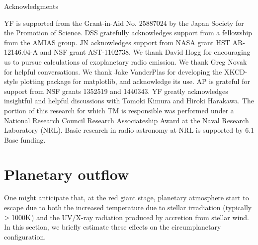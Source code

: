 \documentclass[iop,numberedappendix,apj,twocolappendix,]{emulateapj}
\begin{document}
\acknowledgements

{\sc Acknowledgments}

YF is supported from the Grant-in-Aid No. 25887024 by the Japan Society for the Promotion of Science.
DSS gratefully acknowledges support from a fellowship from the AMIAS group. JN acknowledges support from NASA grant HST AR-12146.04-A and NSF grant AST-1102738.
We thank David Hogg for encouraging us to pursue calculations of exoplanetary radio emission.
We thank Greg Novak for helpful conversations.
We thank Jake VanderPlas for developing the XKCD-style plotting package for matplotlib, and acknowledge its use. 
AP is grateful for support from NSF grants 1352519 and 1440343.
YF greatly acknowledges insightful and helpful discussions with Tomoki Kimura and Hiroki Harakawa. 
The portion of this research for which TM is responsible was performed under a National Research 
Council Research Associateship Award at the Naval Research Laboratory (NRL).
Basic research in radio astronomy at NRL is supported by 6.1 Base funding.





\appendix

\color{blue}

\section{Planetary outflow}
\label{ap:outflow}

One might anticipate that, at the red giant stage, planetary atmosphere start to escape due to both the increased temperature due to stellar irradiation (typically $> 1000 {\rm K}$) and the UV/X-ray radiation produced by accretion from stellar wind. 
In this section, we briefly estimate these effects on the circumplanetary configuration. 

\end{document}
